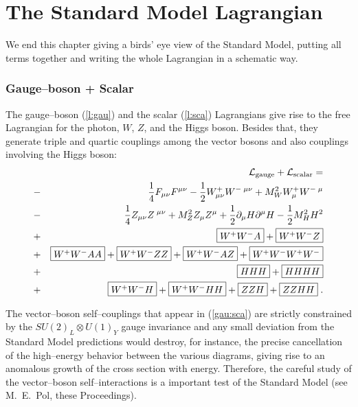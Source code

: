 \documentclass[12pt]{report}
\def\text#1{{\scriptstyle\mathrm{#1}}}
\newcommand{\lag}{{\cal L}}
\newcommand{\del}{\partial}
\begin{document}

\section{The Standard Model Lagrangian} \label{sm:lag} \indent

We end this chapter giving a birds' eye view of the Standard Model,
putting all terms together and writing the whole Lagrangian in a 
sche\-ma\-tic way.

\subsubsection{Gauge--boson + Scalar} \indent

The gauge--boson (\ref{l:gau}) and the scalar (\ref{l:sca})
Lagrangians give rise to the free Lagrangian for the photon, $W$,
$Z$, and the Higgs boson. Besides that, they generate triple and
quartic couplings among the vector bosons and also couplings involving
the Higgs boson:  
\begin{eqnarray}
&&\lag_{\text{gauge}} + \lag_{\text{scalar}} =
\label{gau:sca}
\\
&-& \frac{1}{4} F_{\mu\nu} F^{\mu\nu} 
- \frac{1}{2} W^+_{\mu\nu} W^{-\;\mu\nu} + M_W^2 W^+_{\mu} W^{-\;\mu}
\nonumber \\
&-& \frac{1}{4} Z_{\mu\nu} Z^{\;\mu\nu} + M_Z^2 Z_{\mu} Z^{\mu}
+ \frac{1}{2} \del_\mu H  \del^\mu H - \frac{1}{2} M_H^2 H^2 
\nonumber \\ 
&+& \fbox{$W^+W^-A$} + \fbox{$W^+W^-Z$} 
\nonumber \\  
&+& \fbox{$W^+W^-AA$}+\fbox{$W^+W^-ZZ$}+\fbox{$W^+W^-AZ$}+\fbox{$W^+W^-W^+W^-$} 
\nonumber \\  
&+&\fbox{$HHH$} + \fbox{$HHHH$} 
\nonumber \\ 
&+&\fbox{$W^+W^-H$} + \fbox{$W^+W^-HH$} + \fbox{$ZZH$} + \fbox{$ZZHH$}
\; .
\nonumber 
\end{eqnarray}

The vector--boson self--couplings that appear in (\ref{gau:sca}) are
strictly constrained by the $SU(2)_L \otimes U(1)_Y$ gauge invariance
and any small deviation from the Standard Model predictions would
destroy, for instance, the precise cancellation of the high--energy
behavior between the various diagrams, giving rise to an anomalous
growth of the cross section with energy. Therefore, the careful study
of the vector--boson self--interactions is a important test of the
Standard Model (see M.\ E.\ Pol, these Proceedings).
\end{document}
